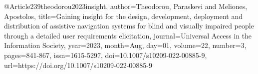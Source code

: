 @Article{239theodorou2023insight,
author={Theodorou, Paraskevi
and Meliones, Apostolos},
title={Gaining insight for the design, development, deployment and distribution of assistive navigation systems for blind and visually impaired people through a detailed user requirements elicitation},
journal={Universal Access in the Information Society},
year={2023},
month={Aug},
day={01},
volume={22},
number={3},
pages={841-867},
issn={1615-5297},
doi={10.1007/s10209-022-00885-9},
url={https://doi.org/10.1007/s10209-022-00885-9}
}